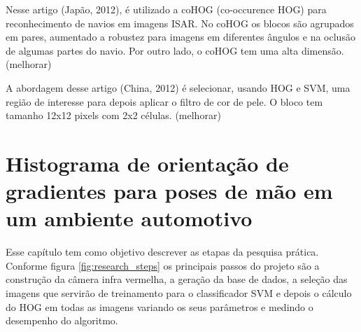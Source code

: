 Nesse artigo \cite{ref8} (Japão, 2012), é utilizado a coHOG (co-occurence HOG) para reconhecimento de navios em imagens ISAR. No coHOG os blocos são agrupados em pares, aumentado a robustez para imagens em diferentes ângulos e na oclusão de algumas partes do navio. Por outro lado, o coHOG tem uma alta dimensão. (melhorar)


A abordagem desse artigo \cite{ref10} (China, 2012) é selecionar, usando HOG e SVM, uma região de interesse para depois aplicar o filtro de cor de pele. O bloco tem tamanho 12x12 pixels com 2x2 células. (melhorar)


\chapter{Histograma de orientação de gradientes para poses de mão em um ambiente automotivo}

Esse capítulo tem como objetivo descrever as etapas da pesquisa prática. Conforme figura \ref{fig:research_steps} os principais passos do projeto são a construção da câmera infra vermelha, a geração da base de dados, a seleção das imagens que servirão de treinamento para o classificador SVM e depois o cálculo do HOG em todas as imagens variando os seus parâmetros e medindo o desempenho do algoritmo.

